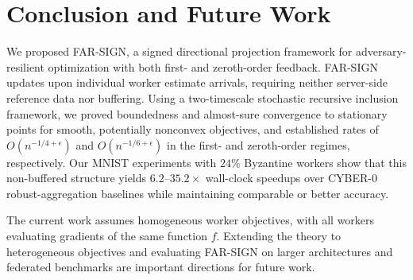 \documentclass{article}
\newcommand{\farsign}{FAR-SIGN\xspace}
\begin{document}
\section{Conclusion and Future Work}
\label{sec:5}
We proposed \farsign{}, a signed directional projection framework for adversary-resilient optimization with both first- and zeroth-order feedback. 
\farsign{} updates upon individual worker estimate arrivals, requiring neither server-side reference data nor buffering. 
Using a two-timescale stochastic recursive inclusion framework, we proved boundedness and almost-sure convergence to stationary points for smooth, potentially nonconvex objectives, and established rates of $O(n^{-1/4+\epsilon})$ and $O(n^{-1/6+\epsilon})$ in the first- and zeroth-order regimes, respectively. 
Our MNIST experiments with $24\%$ Byzantine workers show that this non-buffered structure yields $6.2$--$35.2\times$ wall-clock speedups over CYBER-0 robust-aggregation baselines while maintaining comparable or better accuracy.

The current work assumes homogeneous worker objectives, with all workers evaluating gradients of the same function $f$. Extending the theory to heterogeneous objectives and evaluating \farsign{} on larger architectures and federated benchmarks are important directions for future work.

%



% 
\end{document}

